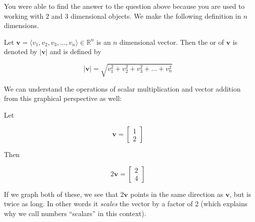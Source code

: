 \documentclass{ximera}
\begin{document}
You were able to find the answer to the question above because you are used to working with $2$ and $3$ dimensional objects.  We make the following definition in $n$ dimensions.

\begin{definition}
	Let $\mathbf{v} = \langle v_1, v_2, v_3, \dots, v_n \rangle \in \mathbb{R}^n$ is an $n$ dimensional vector.  Then the  or  of $\mathbf{v}$ is denoted by $|\mathbf{v}|$ and is defined by
	
	\[
	|\mathbf{v}| = \sqrt{v_1^2+v_2^2+v_3^2+\dots+v_n^2}
	\]
\end{definition}

We can understand the operations of scalar multiplication and vector addition from this graphical perspective as well:

Let

\[
\mathbf{v} = \begin{bmatrix} 1  \\ 2  \end{bmatrix}
\]

Then 

\[
2\mathbf{v} =  \begin{bmatrix} 2  \\ 4  \end{bmatrix}
\]

If we graph both of these, we see that $2\mathbf{v}$ points in the same direction as $\mathbf{v}$, but is twice as long.  In other words it \textit{scales} the vector by a factor of $2$ (which explains why we call numbers ``scalars'' in this context). 


\begin{image}
\end{image}
\end{document}

